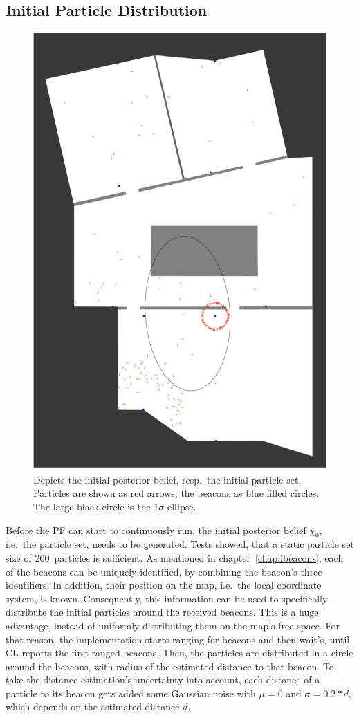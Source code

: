 \subsection{Initial Particle Distribution}\label{sec:algo_initial}

\begin{figure}
\includegraphics[height=0.7\textwidth]{figures/algo_particle_generation}
\caption{Depicts the initial posterior belief, resp.\ the initial particle set. Particles are shown as red arrows, the beacons as blue filled circles. The large black circle is the $1\sigma$-ellipse.}
\label{fig:pf_initialDist}
\end{figure}

Before the \ac{PF} can start to continuously run, the initial posterior belief $\chi_0$, i.e.\ the particle set, needs to be generated. Tests showed, that a static particle set size of 200~particles is sufficient. As mentioned in chapter~\ref{chap:ibeacons}, each of the beacons can be uniquely identified, by combining the beacon's three identifiers. In addition, their position on the map, i.e.\ the local coordinate system, is known. Consequently, this information can be used to specifically distribute the initial particles around the received beacons. This is a huge advantage, instead of uniformly distributing them on the map's free space. For that reason, the implementation starts ranging for beacons and then wait's, until \ac{CL} reports the first ranged beacons. Then, the particles are distributed in a circle around the beacons, with radius of the estimated distance to that beacon. To take the distance estimation's uncertainty into account, each distance of a particle to its beacon gets added some Gaussian noise with $\mu = 0$ and $\sigma = 0.2 * d$, which depends on the estimated distance $d$. 

